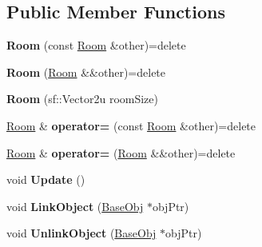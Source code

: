 \subsection*{Public Member Functions}
\begin{DoxyCompactItemize}
\item 
\hypertarget{class_helios_1_1_room_adde05da30e6a7923349d3682f77a595e}{}{\bfseries Room} (const \hyperlink{class_helios_1_1_room}{Room} \&other)=delete\label{class_helios_1_1_room_adde05da30e6a7923349d3682f77a595e}

\item 
\hypertarget{class_helios_1_1_room_a49dee88dbca1430546f49dedda0ef88a}{}{\bfseries Room} (\hyperlink{class_helios_1_1_room}{Room} \&\&other)=delete\label{class_helios_1_1_room_a49dee88dbca1430546f49dedda0ef88a}

\item 
\hypertarget{class_helios_1_1_room_a069b54c002742b2e943e281520654d43}{}{\bfseries Room} (sf\+::\+Vector2u room\+Size)\label{class_helios_1_1_room_a069b54c002742b2e943e281520654d43}

\item 
\hypertarget{class_helios_1_1_room_ac4529d35e99e767f434e0c33f922257a}{}\hyperlink{class_helios_1_1_room}{Room} \& {\bfseries operator=} (const \hyperlink{class_helios_1_1_room}{Room} \&other)=delete\label{class_helios_1_1_room_ac4529d35e99e767f434e0c33f922257a}

\item 
\hypertarget{class_helios_1_1_room_a9f5645c1ec1a46c98ee7621c7a327723}{}\hyperlink{class_helios_1_1_room}{Room} \& {\bfseries operator=} (\hyperlink{class_helios_1_1_room}{Room} \&\&other)=delete\label{class_helios_1_1_room_a9f5645c1ec1a46c98ee7621c7a327723}

\item 
\hypertarget{class_helios_1_1_room_aeb4ac37cb202acbe6b0f95c3f06ebb9d}{}void {\bfseries Update} ()\label{class_helios_1_1_room_aeb4ac37cb202acbe6b0f95c3f06ebb9d}

\item 
\hypertarget{class_helios_1_1_room_a1dc648407daeb69bed664c1b6aca899d}{}void {\bfseries Link\+Object} (\hyperlink{class_helios_1_1_base_obj}{Base\+Obj} $\ast$obj\+Ptr)\label{class_helios_1_1_room_a1dc648407daeb69bed664c1b6aca899d}

\item 
\hypertarget{class_helios_1_1_room_ae94868797f3224f81604193f7e6e9af0}{}void {\bfseries Unlink\+Object} (\hyperlink{class_helios_1_1_base_obj}{Base\+Obj} $\ast$obj\+Ptr)\label{class_helios_1_1_room_ae94868797f3224f81604193f7e6e9af0}

\end{DoxyCompactItemize}


